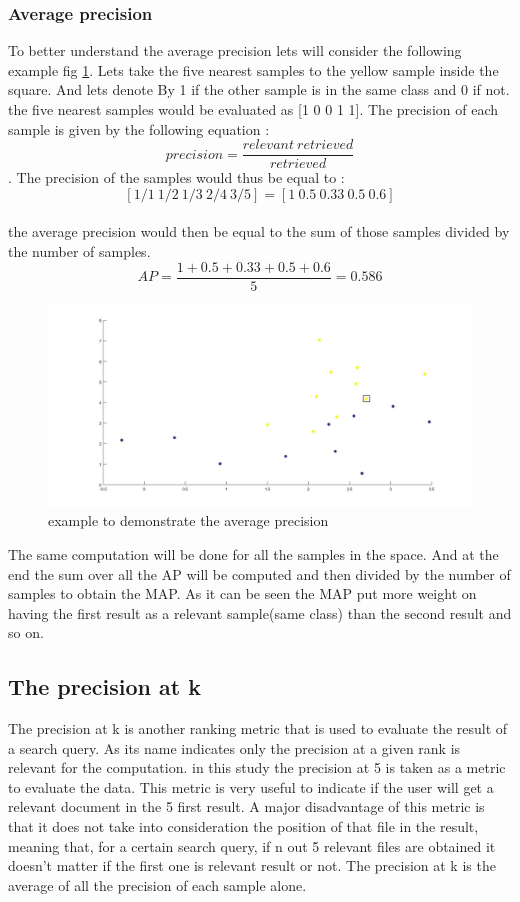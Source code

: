 \documentclass[hidelinks,12pt]{report}
\begin{document}
\subsubsection{Average precision}
To better understand the average precision lets will consider the following example fig \ref{example}. Lets take the five nearest samples to the yellow sample inside the square. And lets denote By 1 if the other sample is in the same class and 0 if not. the five nearest samples would be evaluated as [1 0 0 1 1]. The precision of each sample is given by the following equation : $$precision=\frac{relevant\  retrieved}{retrieved}$$. The precision of the samples would thus be equal to : $$[1/1 \  1/2 \ 1/3\  2/4\  3/5]=[1 \ 0.5 \   0.33 \ 0.5 \ 0.6]$$\\ the average precision would then be equal to the sum of those samples divided by the number of samples.$$AP=\frac{1+0.5+0.33+0.5+0.6}{5}=0.586$$
\begin{figure}[t!]
  
  \centering
	    \includegraphics[width=1\textwidth]{fig1.jpg}
    \caption{example to demonstrate the average precision}
    \label{example}
\end{figure}
The same computation will be done for all the samples in the space. And at the end the sum over all the AP will be computed and then divided  by the number of samples to obtain the MAP. As it can be seen the MAP put more weight on having the first result as a relevant sample(same class) than the second result and so on.
\subsection{The precision at k}
The precision at k is another ranking metric that is used to evaluate the result of a search query. As its name indicates only the precision at a given rank is relevant for the computation. in this study the precision at 5 is taken as a metric to evaluate the data. This metric is very useful to indicate if the user will get a relevant document in the 5 first result. A major disadvantage of this metric is that it does not take into consideration the position of that file in the result, meaning that, for a certain search query, if n out 5 relevant files are obtained it doesn't matter if the first one is relevant result or not. The precision at k is the average of all the precision of each sample alone.
\end{document}
